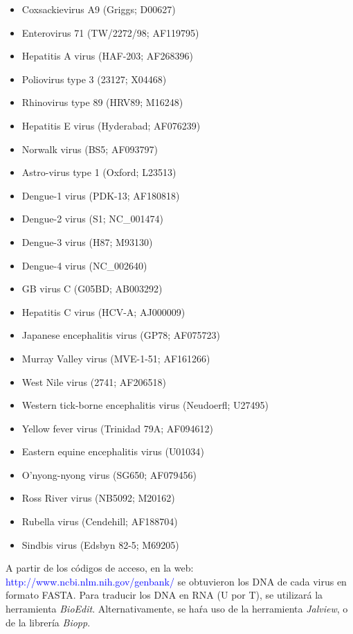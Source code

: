\documentclass[12pt,a4paper,spanish]{article}
\begin{document}
		\begin{itemize}
			\item Coxsackievirus A9 (Griggs; \textsc{D00627})
			\item Enterovirus 71 (TW/2272/98; \textsc{AF119795})
			\item Hepatitis A virus (HAF-203; \textsc{AF268396})
			\item Poliovirus type 3 (23127; \textsc{X04468})
			\item Rhinovirus type 89 (HRV89; \textsc{M16248})
			\item Hepatitis E virus (Hyderabad; \textsc{AF076239})
			\item Norwalk virus (BS5; \textsc{AF093797})
			\item Astro-virus type 1 (Oxford; \textsc{L23513})
			\item Dengue-1 virus (PDK-13; \textsc{AF180818})
			\item Dengue-2 virus (S1; \textsc{NC\_001474})
			\item Dengue-3 virus (H87; \textsc{M93130})
			\item Dengue-4 virus (\textsc{NC\_002640})
			\item GB virus C (G05BD; \textsc{AB003292})
			\item Hepatitis C virus (HCV-A; \textsc{AJ000009})
			\item Japanese encephalitis virus (GP78; \textsc{AF075723})
			\item Murray Valley virus (MVE-1-51; \textsc{AF161266})
			\item West Nile virus (2741; \textsc{AF206518})
			\item Western tick-borne encephalitis virus (Neudoerfl; \textsc{U27495})
			\item Yellow fever virus (Trinidad 79A; \textsc{AF094612})
			\item Eastern equine encephalitis virus (\textsc{U01034})
			\item O’nyong-nyong virus (SG650; \textsc{AF079456})
			\item Ross River virus (NB5092; \textsc{M20162})
			\item Rubella virus (Cendehill; \textsc{AF188704})
			\item Sindbis virus (Edsbyn 82-5; \textsc{M69205})
		\end{itemize}

		A partir de los códigos de acceso, en la web: \textcolor{blue}{http://www.ncbi.nlm.nih.gov/genbank/} se obtuvieron 			los DNA de cada virus en formato FASTA. Para traducir los DNA en RNA (U por T), se utilizará la herramienta 		\textit{BioEdit}. Alternativamente, se haŕa uso de la herramienta \textit{Jalview}, o de la librería 		
		\textit{Biopp}. 
\end{document}
